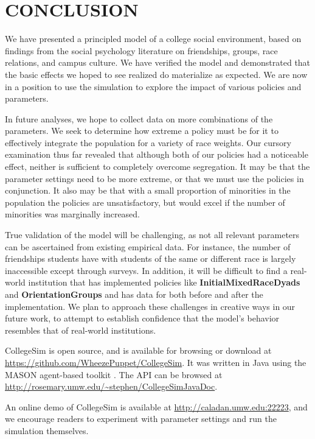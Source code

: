 
\section{CONCLUSION}
\label{sec:discussion}

We have presented a principled model of a college social environment, based on
findings from the social psychology literature on friendships, groups, race
relations, and campus culture. We have verified the model and demonstrated
that the basic effects we hoped to see realized do materialize as expected. We
are now in a position to use the simulation to explore the impact of various
policies and parameters.

In future analyses, we hope to collect data on more combinations of the
parameters. We seek to determine how extreme a policy must be for it to
effectively integrate the population for a variety of race weights. Our
cursory examination thus far revealed that although both of our policies had a
noticeable effect, neither is sufficient to completely overcome segregation.
It may be that the parameter settings need to be more extreme, or that we must
use the policies in conjunction. It also may be that with a small proportion
of minorities in the population the policies are unsatisfactory, but would
excel if the number of minorities was marginally increased. 

True validation of the model will be challenging, as not all relevant
parameters can be ascertained from existing empirical data. For instance, the
number of friendships students have with students of the same or different
race is largely inaccessible except through surveys. In addition, it will be
difficult to find a real-world institution that has implemented policies like
\textbf{InitialMixedRaceDyads} and \textbf{OrientationGroups} and has data for
both before and after the implementation. We plan to approach these challenges
in creative ways in our future work, to attempt to establish confidence that
the model's behavior resembles that of real-world institutions.

CollegeSim is open source, and is available for browsing or download at
\url{https://github.com/WheezePuppet/CollegeSim}. It was written in Java
using the MASON agent-based toolkit \cite{luke_mason:_2005}. The API can be
browsed at \url{http://rosemary.umw.edu/~stephen/CollegeSimJavaDoc}.

An online demo of CollegeSim is available at
\url{http://caladan.umw.edu:22223}, and we encourage readers to experiment
with parameter settings and run the simulation themselves.

